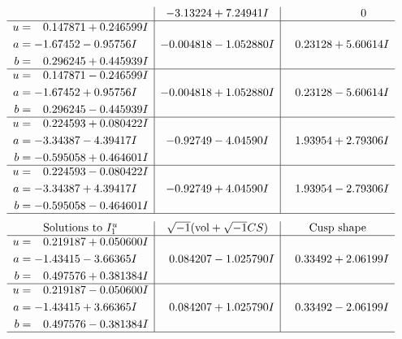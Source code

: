 \documentclass[1p]{elsarticle_modified}
\theoremstyle{definition}
\newcommand{\I}{\sqrt{-1}}
\begin{document}
$$\begin{array}{c|c|c}
 & -3.13224 + 7.24941 I & \phantom{-0.000000 } 0 \\ \hline\begin{aligned}
u &= \phantom{-}0.147871 + 0.246599 I \\
a &= -1.67452 - 0.95756 I \\
b &= \phantom{-}0.296245 + 0.445939 I\end{aligned}
 & -0.004818 - 1.052880 I & \phantom{-}0.23128 + 5.60614 I \\ \hline\begin{aligned}
u &= \phantom{-}0.147871 - 0.246599 I \\
a &= -1.67452 + 0.95756 I \\
b &= \phantom{-}0.296245 - 0.445939 I\end{aligned}
 & -0.004818 + 1.052880 I & \phantom{-}0.23128 - 5.60614 I \\ \hline\begin{aligned}
u &= \phantom{-}0.224593 + 0.080422 I \\
a &= -3.34387 - 4.39417 I \\
b &= -0.595058 + 0.464601 I\end{aligned}
 & -0.92749 - 4.04590 I & \phantom{-}1.93954 + 2.79306 I \\ \hline\begin{aligned}
u &= \phantom{-}0.224593 - 0.080422 I \\
a &= -3.34387 + 4.39417 I \\
b &= -0.595058 - 0.464601 I\end{aligned}
 & -0.92749 + 4.04590 I & \phantom{-}1.93954 - 2.79306 I\\
 \hline 
 \end{array}$$\newpage$$\begin{array}{c|c|c}  
\text{Solutions to }I^u_{1}& \I (\text{vol} + \sqrt{-1}CS) & \text{Cusp shape}\\
 \hline 
\begin{aligned}
u &= \phantom{-}0.219187 + 0.050600 I \\
a &= -1.43415 - 3.66365 I \\
b &= \phantom{-}0.497576 + 0.381384 I\end{aligned}
 & \phantom{-}0.084207 - 1.025790 I & \phantom{-}0.33492 + 2.06199 I \\ \hline\begin{aligned}
u &= \phantom{-}0.219187 - 0.050600 I \\
a &= -1.43415 + 3.66365 I \\
b &= \phantom{-}0.497576 - 0.381384 I\end{aligned}
 & \phantom{-}0.084207 + 1.025790 I & \phantom{-}0.33492 - 2.06199 I\\
 \hline 
 \end{array}$$\newpage\newpage\renewcommand{\arraystretch}{1}
\end{document}
